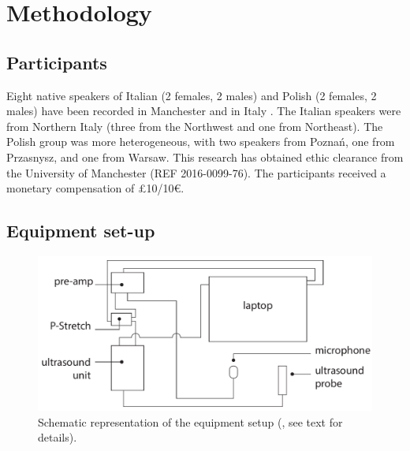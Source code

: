\documentclass[authoryear, twocolumn]{elsarticle}
\newcommand{\euro}{€}
\begin{document}
\section{Methodology}\label{methodology}

\subsection{Participants}\label{participants}


Eight native speakers of Italian (2 females, 2 males) and Polish (2
females, 2 males) have been recorded in Manchester and in Italy
. The Italian speakers were from Northern Italy
(three from the Northwest and one from Northeast). The Polish group was
more heterogeneous, with two speakers from Poznań, one from Przasnysz,
and one from Warsaw. This research has obtained ethic clearance from the
University of Manchester (REF 2016-0099-76). The participants received a
monetary compensation of £10/10\euro{}.

\subsection{Equipment set-up}\label{equipment-set-up}

\begin{figure}
    \centering
    \includegraphics[width=.7\textwidth]{../../graphics/uti-setup.pdf}
    \caption{Schematic representation of the equipment setup (\citealt{articulate2011}, see text for details).}
    \label{f:uti-setup}
\end{figure}
\end{document}
